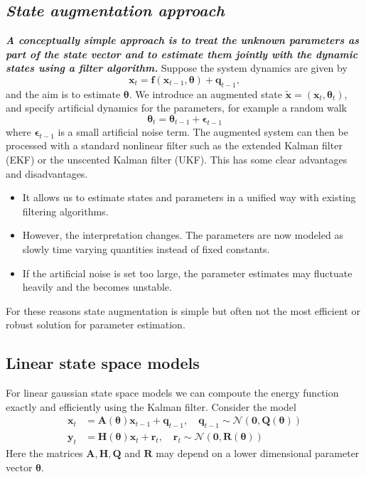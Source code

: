 \subsection*{\textbf{\textit{State augmentation approach}}}
\textbf{\textit{A conceptually simple approach is to treat the unknown parameters as part of the state vector and to estimate them jointly with the dynamic states using a filter algorithm. }}
Suppose the system dynamics are given by
\[
\mathbf{x}_t = \mathbf{f}(\mathbf{x}_{t-1},\boldsymbol{\theta}) + \mathbf{q}_{t-1},
\]
and the aim is to estimate $\boldsymbol{\theta}$. We introduce an augmented state $\mathbf{\tilde x} = (\mathbf{x}_t,\boldsymbol{\theta}_t)$, and specify artificial dynamics for the parameters, for example a random walk
\begin{equation}
    \boldsymbol{\theta}_t = \boldsymbol{\theta}_{t-1}+\boldsymbol{\epsilon}_{t-1}
\end{equation}
where $\boldsymbol{\epsilon}_{t-1}$ is a small artificial noise term. 
The augmented system can then be processed with a standard nonlinear filter such as the extended Kalman filter (EKF) or the unscented Kalman filter (UKF). This has some clear advantages and disadvantages. 
\begin{itemize}
    \item It allows us to estimate states and parameters in a unified way with existing filtering algorithms.
    \item However, the interpretation changes. The parameters are now modeled as slowly time varying quantities instead of fixed constants.
    \item If the artificial noise is set too large, the parameter estimates may fluctuate heavily and the becomes unstable. 
\end{itemize}
For these reasons state augmentation is simple but often not the most efficient or robust solution for parameter estimation. 
\subsection*{Linear state space models}
For linear gaussian state space models we can compoute the energy function exactly and efficiently using the Kalman filter. 
Consider the model
\begin{equation}
    \begin{aligned}
        \mathbf{x}_t &= \mathbf{A}(\boldsymbol{\theta})\mathbf{x}_{t-1}+\mathbf{q}_{t-1}, \quad \mathbf{q}_{t-1} \sim \mathcal{N}(\mathbf{0},\mathbf{Q}(\boldsymbol{\theta})) \\
        \mathbf{y}_t &= \mathbf{H}(\boldsymbol{\theta})\mathbf{x}_{t}+\mathbf{r}_{t}, \quad \mathbf{r}_t \sim \mathcal{N}(\mathbf{0},\mathbf{R}(\boldsymbol{\theta}))
    \end{aligned}
\end{equation}
Here the matrices $\mathbf{A}, \mathbf{H}, \mathbf{Q}$ and $\mathbf{R}$ may depend on a lower dimensional parameter vector $\boldsymbol{\theta}$.


